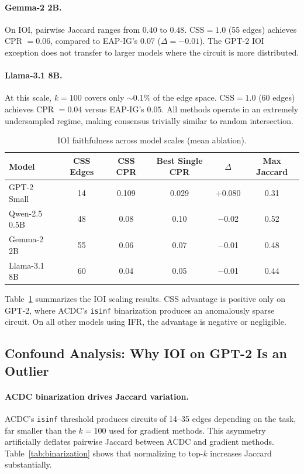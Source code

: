 \documentclass[11pt]{article}
\begin{document}
\paragraph{Gemma-2 2B.} On IOI, pairwise Jaccard ranges from $0.40$ to $0.48$. CSS$=1.0$ (55 edges) achieves CPR $= 0.06$, compared to EAP-IG's $0.07$ ($\Delta = -0.01$). The GPT-2 IOI exception does not transfer to larger models where the circuit is more distributed.

\paragraph{Llama-3.1 8B.} At this scale, $k=100$ covers only $\sim$0.1\% of the edge space. CSS$=1.0$ (60 edges) achieves CPR $= 0.04$ versus EAP-IG's $0.05$. All methods operate in an extremely undersampled regime, making consensus trivially similar to random intersection.

\begin{table}[h]
\centering
\caption{IOI faithfulness across model scales (mean ablation).}
\label{tab:scale}
\begin{tabular}{lccccc}
\toprule
Model & CSS Edges & CSS CPR & Best Single CPR & $\Delta$ & Max Jaccard \\
\midrule
GPT-2 Small & 14 & 0.109 & 0.029 & +0.080 & 0.31 \\
Qwen-2.5 0.5B & 48 & 0.08 & 0.10 & $-$0.02 & 0.52 \\
Gemma-2 2B & 55 & 0.06 & 0.07 & $-$0.01 & 0.48 \\
Llama-3.1 8B & 60 & 0.04 & 0.05 & $-$0.01 & 0.44 \\
\bottomrule
\end{tabular}
\end{table}

Table~\ref{tab:scale} summarizes the IOI scaling results. CSS advantage is positive only on GPT-2, where ACDC's \texttt{isinf} binarization produces an anomalously sparse circuit. On all other models using IFR, the advantage is negative or negligible.

\subsection{Confound Analysis: Why IOI on GPT-2 Is an Outlier}
\label{sec:confound}

\paragraph{ACDC binarization drives Jaccard variation.} ACDC's \texttt{isinf} threshold produces circuits of 14--35 edges depending on the task, far smaller than the $k=100$ used for gradient methods. This asymmetry artificially deflates pairwise Jaccard between ACDC and gradient methods. Table~\ref{tab:binarization} shows that normalizing to top-$k$ increases Jaccard substantially.
\end{document}
